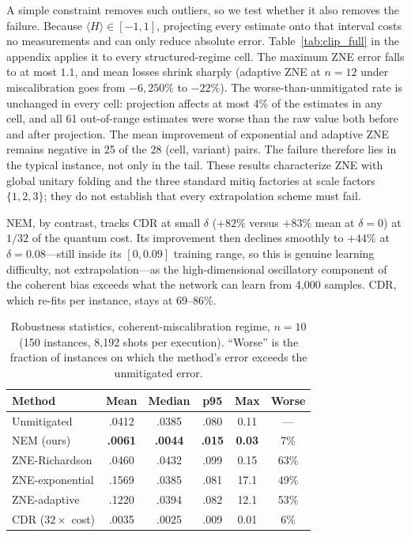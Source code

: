 \documentclass[11pt]{article}
\newcommand{\expect}[1]{\langle#1\rangle}
\begin{document}
A simple constraint removes such outliers, so we test whether it also removes the failure. Because $\expect{H}\in[-1,1]$, projecting every estimate onto that interval costs no measurements and can only reduce absolute error. Table~\ref{tab:clip_full} in the appendix applies it to every structured-regime cell. The maximum ZNE error falls to at most $1.1$, and mean losses shrink sharply (adaptive ZNE at $n{=}12$ under miscalibration goes from $-6{,}250\%$ to $-22\%$). The worse-than-unmitigated rate is unchanged in every cell: projection affects at most 4\% of the estimates in any cell, and all 61 out-of-range estimates were worse than the raw value both before and after projection. The mean improvement of exponential and adaptive ZNE remains negative in 25 of the 28 (cell, variant) pairs. The failure therefore lies in the typical instance, not only in the tail. These results characterize ZNE with global unitary folding and the three standard mitiq factories at scale factors $\{1,2,3\}$; they do not establish that every extrapolation scheme must fail.

NEM, by contrast, tracks CDR at small $\delta$ ($+82\%$ versus $+83\%$ mean at $\delta=0$) at $1/32$ of the quantum cost. Its improvement then declines smoothly to $+44\%$ at $\delta=0.08$---still inside its $[0,0.09]$ training range, so this is genuine learning difficulty, not extrapolation---as the high-dimensional oscillatory component of the coherent bias exceeds what the network can learn from 4{,}000 samples. CDR, which re-fits per instance, stays at 69--86\%.

\begin{table}[t]
\caption{Robustness statistics, coherent-miscalibration regime, $n{=}10$ (150 instances, 8{,}192 shots per execution). ``Worse'' is the fraction of instances on which the method's error exceeds the unmitigated error.}
\label{tab:safety}
\centering
\small
\begin{tabular}{lccccc}
\toprule
Method & Mean & Median & p95 & Max & Worse \\
\midrule
Unmitigated & .0412 & .0385 & .080 & 0.11 & --- \\
NEM (ours) & \textbf{.0061} & \textbf{.0044} & \textbf{.015} & \textbf{0.03} & 7\% \\
ZNE-Richardson & .0460 & .0432 & .099 & 0.15 & 63\% \\
ZNE-exponential & .1569 & .0385 & .081 & 17.1 & 49\% \\
ZNE-adaptive & .1220 & .0394 & .082 & 12.1 & 53\% \\
CDR ($32\times$ cost) & .0035 & .0025 & .009 & 0.01 & 6\% \\
\bottomrule
\end{tabular}
\end{table}
\end{document}
